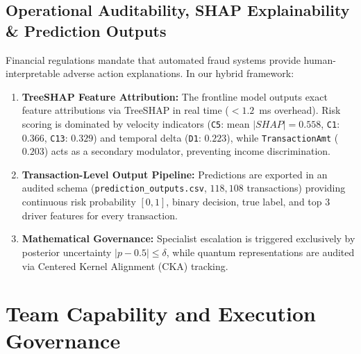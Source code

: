 \documentclass[10pt,a4paper]{article}
\begin{document}
\subsection{Operational Auditability, SHAP Explainability \& Prediction Outputs}
Financial regulations mandate that automated fraud systems provide human-interpretable adverse action explanations. In our hybrid framework:
\begin{enumerate}[leftmargin=*,itemsep=0.1pt,topsep=0.5pt]
\item \textbf{TreeSHAP Feature Attribution:} The frontline model outputs exact feature attributions via TreeSHAP in real time ($<1.2$~ms overhead). Risk scoring is dominated by velocity indicators (\texttt{C5}: mean $|SHAP|=0.558$, \texttt{C1}: $0.366$, \texttt{C13}: $0.329$) and temporal delta (\texttt{D1}: $0.223$), while \texttt{TransactionAmt} ($0.203$) acts as a secondary modulator, preventing income discrimination.
\item \textbf{Transaction-Level Output Pipeline:} Predictions are exported in an audited schema (\texttt{prediction\_outputs.csv}, $118,108$ transactions) providing continuous risk probability $[0, 1]$, binary decision, true label, and top 3 driver features for every transaction.
\item \textbf{Mathematical Governance:} Specialist escalation is triggered exclusively by posterior uncertainty $|p - 0.5| \le \delta$, while quantum representations are audited via Centered Kernel Alignment (CKA) tracking.
\end{enumerate}

\clearpage


\section{Team Capability and Execution Governance}
\end{document}
